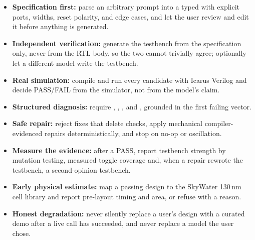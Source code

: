 \begin{itemize}
\item \textbf{Specification first:} parse an arbitrary prompt into a typed
 with explicit ports, widths, reset polarity, and edge cases,
and let the user review and edit it before anything is generated.
\item \textbf{Independent verification:} generate the testbench from the
specification only, never from the RTL body, so the two cannot trivially agree;
optionally let a different model write the testbench.
\item \textbf{Real simulation:} compile and run every candidate with Icarus
Verilog and decide PASS/FAIL from the simulator, not from the model's claim.
\item \textbf{Structured diagnosis:} require , ,
, and , grounded in the first failing vector.
\item \textbf{Safe repair:} reject fixes that delete checks, apply mechanical
compiler-evidenced repairs deterministically, and stop on no-op or oscillation.
\item \textbf{Measure the evidence:} after a PASS, report testbench strength by
mutation testing, measured toggle coverage and, when a repair rewrote the testbench,
a second-opinion testbench.
\item \textbf{Early physical estimate:} map a passing design to the SkyWater 130\,nm
cell library and report pre-layout timing and area, or refuse with a reason.
\item \textbf{Honest degradation:} never silently replace a user's design with a
curated demo after a live call has succeeded, and never replace a model the user
chose.
\end{itemize}

